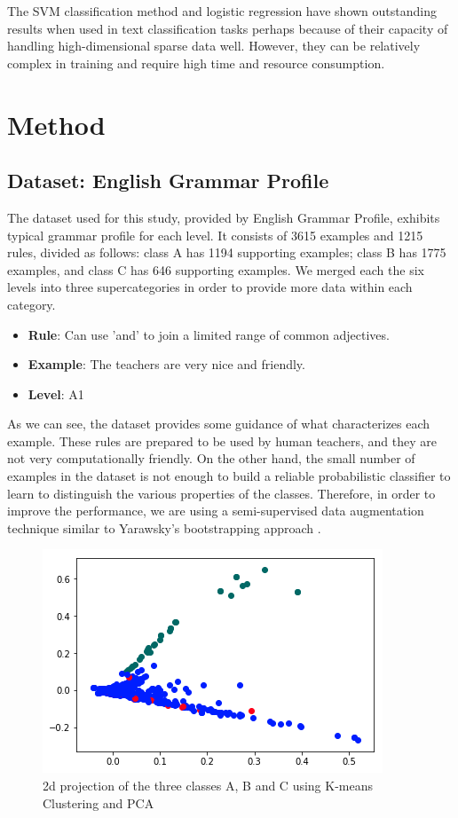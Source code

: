 The SVM classification method and logistic regression have shown outstanding results when used in text classification tasks \citep{Yang1999ARO} \citep{brucher2002document} perhaps because of their capacity of handling high-dimensional sparse data well.  However, they can be relatively complex in training and require high time and resource consumption.



\section{Method}
\label{sec:logistic}

\subsection{Dataset: English Grammar Profile}
The dataset used for this study, provided by English Grammar Profile, exhibits typical grammar profile for each level. It consists of 3615 examples and 1215 rules, divided as follows: class A has 1194 supporting examples; class B has 1775 examples, and class C has 646 supporting examples. We merged each the six levels into three supercategories in order to provide more data within each category. 

\begin{itemize}
    \item \textbf{Rule}: Can use 'and' to join a limited range of common adjectives.
    \item \textbf{Example}: The teachers are very nice and friendly.
    \item \textbf{Level}: A1
\end{itemize}
As we can see, the dataset provides some guidance of what characterizes each example. These rules are prepared to be used by human teachers, and they are not very computationally friendly. On the other hand, the small number of examples in the dataset is not enough to build a reliable probabilistic classifier to learn to distinguish the various properties of the classes. Therefore, in order to improve the performance, we are using a semi-supervised data augmentation technique similar to Yarawsky's bootstrapping approach \citep{yarowsky_unsupervised_1995}. 

\begin{figure}[t]
    \centering
    \includegraphics[width=.75\linewidth]{../Figures/pca_proj.png} 
    \caption{2d projection of the three classes A, B and C using K-means Clustering and PCA}
    \label{fig:cmdstudy}
\end{figure}

